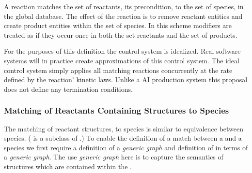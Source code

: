 \documentclass{cekarticle}
\begin{document}
A reaction matches the set of reactants, its precondition, to the
set of species, in the global database.  The effect of the
reaction is to remove reactant entities and create product
entities within the set of species.  In this scheme modifiers are
treated as if they occur once in both the set reactants and the
set of products.

For the purposes of this definition the control system is
idealized. Real software systems will in practice create
approximations of this control system.  The ideal control system
simply applies all matching reactions concurrently at the rate
defined by the reaction' kinetic laws.  Unlike a AI production
system this proposal does not define any termination conditions.

\subsubsection{Matching of Reactants Containing  Structures to Species}

The matching of reactant  structures, to
species is similar to equivalence between species.
( is a subclass of
.)  To enable the definition of a
match between a  and a species we first
require a definition of a \emph{generic graph} and definition of
 in terms of a \emph{generic graph}. The
use \emph{generic graph} here is to capture the semantics of
 structures which are contained within the
.
\end{document}
